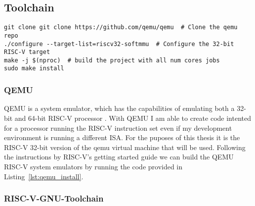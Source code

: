 \subsection{Toolchain}
\begin{lstlisting}[caption=Installing QEMU, float=*, label=lst:qemu_install]
git clone git clone https://github.com/qemu/qemu  # Clone the qemu repo
./configure --target-list=riscv32-softmmu  # Configure the 32-bit RISC-V target
make -j $(nproc)  # build the project with all num cores jobs
sudo make install
\end{lstlisting}
\subsubsection{QEMU}
QEMU is a system emulator, which has the capabilities of emulating both a 32-bit
and 64-bit RISC-V processor \cite{QEMU}. With QEMU I am able to create code intented
for a processor running the RISC-V instruction set even if my development
environment is running a different ISA. For the puposes of this thesis it is the
RISC-V 32-bit version of the qemu virtual machine that will be used.
Following the instructions by RISC-V's getting started guide
we can build the QEMU RISC-V system emulators by running the code
provided in Listing~\ref{lst:qemu_install}\cite{RISC-V_GS}.

\subsubsection{RISC-V-GNU-Toolchain}


